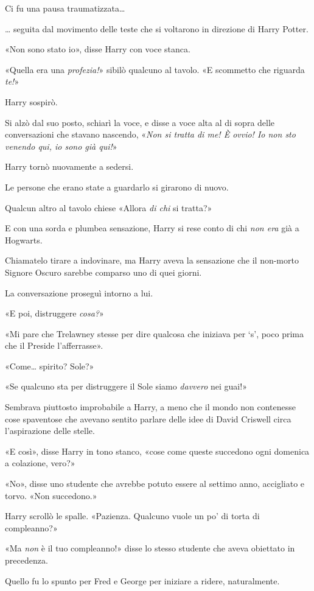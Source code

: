 Ci fu una pausa traumatizzata…

… seguita dal movimento delle teste che si voltarono in direzione di Harry Potter.

«Non sono stato io», disse Harry con voce stanca.

«Quella era una \textit{profezia!}» sibilò qualcuno al tavolo. «E scommetto che riguarda \textit{te!}»

Harry sospirò.

Si alzò dal suo posto, schiarì la voce, e disse a voce alta al di sopra delle conversazioni che stavano nascendo, «\textit{Non si tratta di me! È ovvio! Io non sto venendo qui, io sono già qui!}»

Harry tornò nuovamente a sedersi.

Le persone che erano state a guardarlo si girarono di nuovo.

Qualcun altro al tavolo chiese «Allora \textit{di chi} si tratta?»

E con una sorda e plumbea sensazione, Harry si rese conto di chi \textit{non era} già a Hogwarts.

Chiamatelo tirare a indovinare, ma Harry aveva la sensazione che il non-morto Signore Oscuro sarebbe comparso uno di quei giorni.

La conversazione proseguì intorno a lui.

«E poi, distruggere \textit{cosa?}»

«Mi pare che Trelawney stesse per dire qualcosa che iniziava per ‘s’, poco prima che il Preside l’afferrasse».

«Come… spirito? Sole?»

«Se qualcuno sta per distruggere il Sole siamo \textit{davvero} nei guai!»

Sembrava piuttosto improbabile a Harry, a meno che il mondo non contenesse cose spaventose che avevano sentito parlare delle idee di David Criswell circa l’aspirazione delle stelle.

«E così», disse Harry in tono stanco, «cose come queste succedono ogni domenica a colazione, vero?»

«No», disse uno studente che avrebbe potuto essere al settimo anno, accigliato e torvo. «Non succedono.»

Harry scrollò le spalle. «Pazienza. Qualcuno vuole un po’ di torta di compleanno?»

«Ma \textit{non} è il tuo compleanno!» disse lo stesso studente che aveva obiettato in precedenza.

Quello fu lo spunto per Fred e George per iniziare a ridere, naturalmente.

